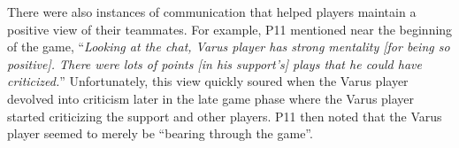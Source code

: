 There were also instances of communication that helped players maintain a positive view of their teammates. For example, P11 mentioned near the beginning of the game, ``\textit{Looking at the chat, Varus player has strong mentality [for being so positive]. There were lots of points [in his support's] plays that he could have criticized.}'' Unfortunately, this view quickly soured when the Varus player devolved into criticism later in the late game phase where the Varus player started criticizing the support and other players. P11 then noted that the Varus player seemed to merely be ``bearing through the game''.